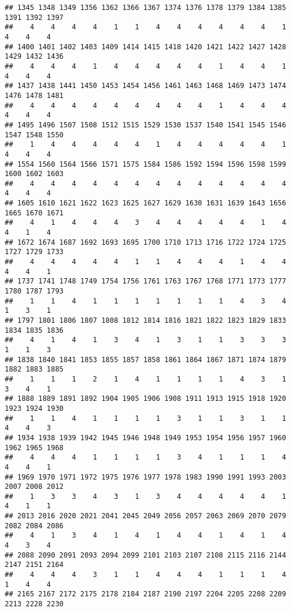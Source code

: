 \documentclass[
]{article}
\begin{document}
\begin{verbatim}
## 1345 1348 1349 1356 1362 1366 1367 1374 1376 1378 1379 1384 1385 1391 1392 1397 
##    4    4    4    4    1    1    4    4    4    4    4    4    1    4    4    4 
## 1400 1401 1402 1403 1409 1414 1415 1418 1420 1421 1422 1427 1428 1429 1432 1436 
##    4    4    4    1    4    4    4    4    4    1    4    4    1    4    4    4 
## 1437 1438 1441 1450 1453 1454 1456 1461 1463 1468 1469 1473 1474 1476 1478 1481 
##    4    4    4    4    4    4    4    4    4    1    4    4    4    4    4    4 
## 1495 1496 1507 1508 1512 1515 1529 1530 1537 1540 1541 1545 1546 1547 1548 1550 
##    1    4    4    4    4    4    1    4    4    4    4    4    1    4    4    4 
## 1554 1560 1564 1566 1571 1575 1584 1586 1592 1594 1596 1598 1599 1600 1602 1603 
##    4    4    4    4    4    4    4    4    4    4    4    4    4    4    4    4 
## 1605 1610 1621 1622 1623 1625 1627 1629 1630 1631 1639 1643 1656 1665 1670 1671 
##    4    1    4    4    4    3    4    4    4    4    4    1    4    4    1    4 
## 1672 1674 1687 1692 1693 1695 1700 1710 1713 1716 1722 1724 1725 1727 1729 1733 
##    4    4    4    4    4    1    1    4    4    4    1    4    4    4    4    1 
## 1737 1741 1748 1749 1754 1756 1761 1763 1767 1768 1771 1773 1777 1780 1787 1793 
##    1    1    4    1    1    1    1    1    1    1    4    3    4    1    3    1 
## 1797 1801 1806 1807 1808 1812 1814 1816 1821 1822 1823 1829 1833 1834 1835 1836 
##    4    1    4    1    3    4    1    3    1    1    3    3    3    1    1    3 
## 1838 1840 1841 1853 1855 1857 1858 1861 1864 1867 1871 1874 1879 1882 1883 1885 
##    1    1    1    2    1    4    1    1    1    1    4    3    1    3    4    1 
## 1888 1889 1891 1892 1904 1905 1906 1908 1911 1913 1915 1918 1920 1923 1924 1930 
##    1    1    4    1    1    1    1    3    1    1    3    1    1    4    4    3 
## 1934 1938 1939 1942 1945 1946 1948 1949 1953 1954 1956 1957 1960 1962 1965 1968 
##    4    4    4    1    1    1    1    3    4    1    1    1    4    4    4    1 
## 1969 1970 1971 1972 1975 1976 1977 1978 1983 1990 1991 1993 2003 2007 2008 2012 
##    1    3    3    4    3    1    3    4    4    4    4    4    1    4    1    1 
## 2013 2016 2020 2021 2041 2045 2049 2056 2057 2063 2069 2070 2079 2082 2084 2086 
##    4    1    3    4    1    4    1    4    4    1    4    1    4    4    3    4 
## 2088 2090 2091 2093 2094 2099 2101 2103 2107 2108 2115 2116 2144 2147 2151 2164 
##    4    4    4    3    1    1    4    4    4    1    1    1    4    1    4    4 
## 2165 2167 2172 2175 2178 2184 2187 2190 2197 2204 2205 2208 2209 2213 2228 2230 

\end{verbatim}
\end{document}
